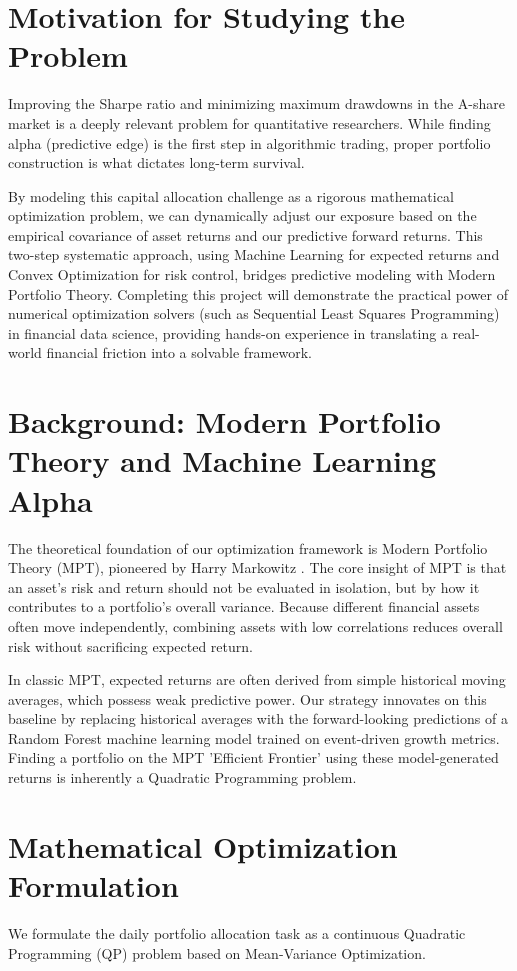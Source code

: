 \documentclass[conference]{IEEEtran}
\begin{document}
\section{Motivation for Studying the Problem}
Improving the Sharpe ratio and minimizing maximum drawdowns in the A-share market is a deeply relevant problem for quantitative researchers. While finding alpha (predictive edge) is the first step in algorithmic trading, proper portfolio construction is what dictates long-term survival. 

By modeling this capital allocation challenge as a rigorous mathematical optimization problem, we can dynamically adjust our exposure based on the empirical covariance of asset returns and our predictive forward returns. This two-step systematic approach, using Machine Learning for expected returns and Convex Optimization for risk control, bridges predictive modeling with Modern Portfolio Theory. Completing this project will demonstrate the practical power of numerical optimization solvers (such as Sequential Least Squares Programming) \cite{boyd2004} in financial data science, providing hands-on experience in translating a real-world financial friction into a solvable framework.

\section{Background: Modern Portfolio Theory and Machine Learning Alpha}
The theoretical foundation of our optimization framework is Modern Portfolio Theory (MPT), pioneered by Harry Markowitz \cite{markowitz1952}. The core insight of MPT is that an asset's risk and return should not be evaluated in isolation, but by how it contributes to a portfolio's overall variance. Because different financial assets often move independently, combining assets with low correlations reduces overall risk without sacrificing expected return.

In classic MPT, expected returns are often derived from simple historical moving averages, which possess weak predictive power. Our strategy innovates on this baseline by replacing historical averages with the forward-looking predictions of a Random Forest machine learning model trained on event-driven growth metrics. Finding a portfolio on the MPT 'Efficient Frontier' using these model-generated returns is inherently a Quadratic Programming problem.

\section{Mathematical Optimization Formulation}
We formulate the daily portfolio allocation task as a continuous Quadratic Programming (QP) problem based on Mean-Variance Optimization. 
\end{document}
